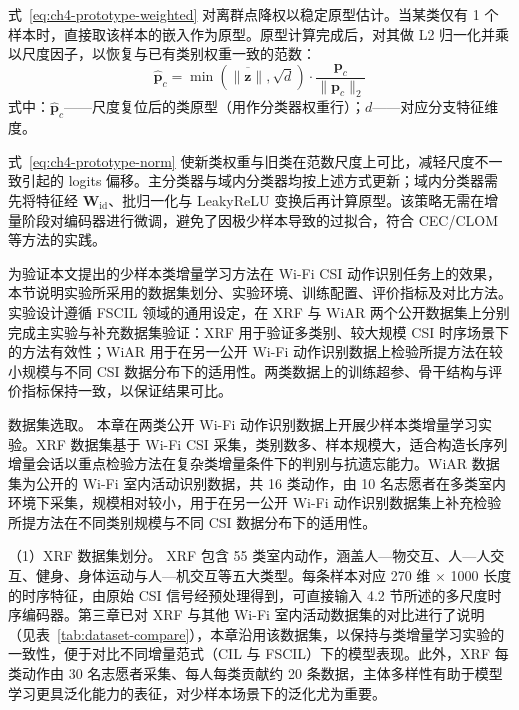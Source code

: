 式~\eqref{eq:ch4-prototype-weighted} 对离群点降权以稳定原型估计。当某类仅有 1 个样本时，直接取该样本的嵌入作为原型。原型计算完成后，对其做 L2 归一化并乘以尺度因子，以恢复与已有类别权重一致的范数：
\begin{equation}\label{eq:ch4-prototype-norm}
  \hat{\mathbf{p}}_c = \min\!\left(\overline{\|\mathbf{z}\|}, \sqrt{d}\right) \cdot \frac{\mathbf{p}_c}{\|\mathbf{p}_c\|_2}
\end{equation}
\noindent 式中：$\hat{\mathbf{p}}_c$——尺度复位后的类原型（用作分类器权重行）；$d$——对应分支特征维度。

式~\eqref{eq:ch4-prototype-norm} 使新类权重与旧类在范数尺度上可比，减轻尺度不一致引起的 logits 偏移。主分类器与域内分类器均按上述方式更新；域内分类器需先将特征经 $\mathbf{W}_{\mathrm{id}}$、批归一化与 LeakyReLU 变换后再计算原型。该策略无需在增量阶段对编码器进行微调，避免了因极少样本导致的过拟合，符合 CEC/CLOM 等方法的实践。


为验证本文提出的少样本类增量学习方法在 Wi-Fi CSI 动作识别任务上的效果，本节说明实验所采用的数据集划分、实验环境、训练配置、评价指标及对比方法。实验设计遵循 FSCIL 领域的通用设定\cite{tian2024fscilsurvey}，在 XRF 与 WiAR 两个公开数据集上分别完成主实验与补充数据集验证：XRF 用于验证多类别、较大规模 CSI 时序场景下的方法有效性；WiAR 用于在另一公开 Wi-Fi 动作识别数据上检验所提方法在较小规模与不同 CSI 数据分布下的适用性。两类数据上的训练超参、骨干结构与评价指标保持一致，以保证结果可比。


数据集选取。 本章在两类公开 Wi-Fi 动作识别数据上开展少样本类增量学习实验。XRF 数据集基于 Wi-Fi CSI 采集，类别数多、样本规模大，适合构造长序列增量会话以重点检验方法在复杂类增量条件下的判别与抗遗忘能力。WiAR 数据集为公开的 Wi-Fi 室内活动识别数据\cite{guo2019wiar}，共 16 类动作，由 10 名志愿者在多类室内环境下采集，规模相对较小，用于在另一公开 Wi-Fi 动作识别数据集上补充检验所提方法在不同类别规模与不同 CSI 数据分布下的适用性。

（1）XRF 数据集划分。 XRF 包含 55 类室内动作，涵盖人—物交互、人—人交互、健身、身体运动与人—机交互等五大类型。每条样本对应 270 维 × 1000 长度的时序特征，由原始 CSI 信号经预处理得到，可直接输入 4.2 节所述的多尺度时序编码器。第三章已对 XRF 与其他 Wi-Fi 室内活动数据集的对比进行了说明（见表~\ref{tab:dataset-compare}），本章沿用该数据集，以保持与类增量学习实验的一致性，便于对比不同增量范式（CIL 与 FSCIL）下的模型表现。此外，XRF 每类动作由 30 名志愿者采集、每人每类贡献约 20 条数据，主体多样性有助于模型学习更具泛化能力的表征，对少样本场景下的泛化尤为重要。

